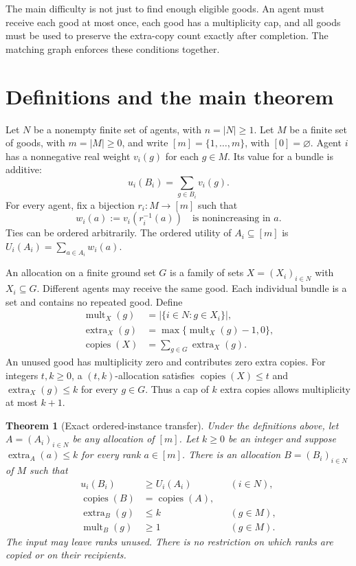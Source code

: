 \documentclass[11pt,a4paper]{article}
\newtheorem{theorem}{Theorem}
\newcommand{\mult}{\operatorname{mult}}
\newcommand{\extra}{\operatorname{extra}}
\newcommand{\copies}{\operatorname{copies}}
\newcommand{\ranks}{[m]}
\begin{document}
The main difficulty is not just to find enough eligible goods. An agent
must receive each good at most once, each good has a multiplicity cap, and
all goods must be used to preserve the extra-copy count exactly after
completion. The matching graph enforces these conditions together.

\section{Definitions and the main theorem}
Let $N$ be a nonempty finite set of agents, with $n=|N|\ge1$. Let $M$ be a
finite set of goods, with $m=|M|\ge0$, and write
$\ranks=\{1,\ldots,m\}$, with $[0]=\varnothing$.
Agent $i$ has a nonnegative real weight $v_i(g)$ for each $g\in M$.
Its value for a bundle is additive:
\[
 u_i(B_i)=\sum_{g\in B_i}v_i(g).
\]
For every agent, fix a bijection $r_i:M\to\ranks$ such that
\[
 w_i(a):=v_i(r_i^{-1}(a))
 \quad\text{is nonincreasing in }a.
\]
Ties can be ordered arbitrarily. The ordered utility of $A_i\subseteq\ranks$
is $U_i(A_i)=\sum_{a\in A_i}w_i(a)$.

An allocation on a finite ground set $G$ is a family of sets
$X=(X_i)_{i\in N}$ with $X_i\subseteq G$. Different agents may receive the
same good. Each individual bundle is a set and contains no repeated good.
Define
\begin{align*}
 \mult_X(g)&=|\{i\in N:g\in X_i\}|,\\
 \extra_X(g)&=\max\{\mult_X(g)-1,0\},\\
 \copies(X)&=\sum_{g\in G}\extra_X(g).
\end{align*}
An unused good has multiplicity zero and contributes zero extra copies.
For integers $t,k\ge0$, a $(t,k)$-allocation satisfies
$\copies(X)\le t$ and $\extra_X(g)\le k$ for every $g\in G$.
Thus a cap of $k$ extra copies allows multiplicity at most $k+1$.

\begin{theorem}[Exact ordered-instance transfer]\label{thm:main}
Under the definitions above, let $A=(A_i)_{i\in N}$ be any allocation of
$\ranks$. Let $k\ge0$ be an integer and suppose
$\extra_A(a)\le k$ for every rank $a\in\ranks$.
There is an allocation $B=(B_i)_{i\in N}$ of $M$ such that
\begin{align}
 u_i(B_i)&\ge U_i(A_i) &&(i\in N),\label{eq:utility}\\
 \copies(B)&=\copies(A),\label{eq:copies}\\
 \extra_B(g)&\le k &&(g\in M),\label{eq:cap}\\
 \mult_B(g)&\ge1 &&(g\in M).\label{eq:cover}
\end{align}
The input may leave ranks unused. There is no restriction on which ranks
are copied or on their recipients.
\end{theorem}
\end{document}
